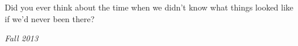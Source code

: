 Did you ever think about the time when we didn't know what things looked like
if we'd never been there?

\begin{flushright}
\textit{Fall 2013}
\end{flushright}



\groupendnotes

